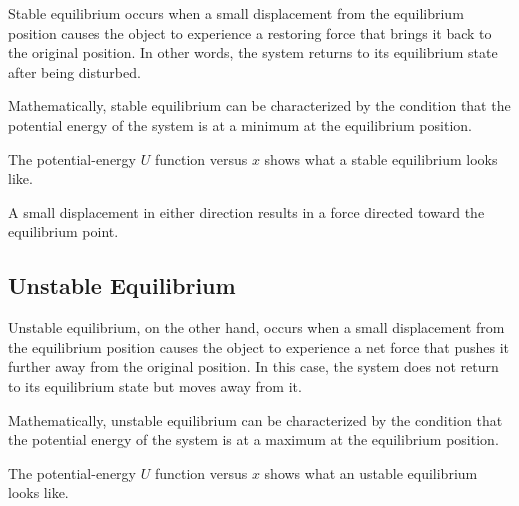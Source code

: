 \documentclass[11pt]{article}
\begin{document}
Stable equilibrium occurs when a small displacement from the equilibrium position causes the object to experience a restoring force that brings it back to the original position. In other words, the system returns to its equilibrium state after being disturbed. 

Mathematically, stable equilibrium can be characterized by the condition that the potential energy of the system is at a minimum at the equilibrium position. 

The potential-energy $U$ function versus $x$ shows what a stable equilibrium looks like.

\begin{center}
\end{center}

A small displacement in either direction results in a force directed toward the equilibrium point.

\subsection{Unstable Equilibrium}

Unstable equilibrium, on the other hand, occurs when a small displacement from the equilibrium position causes the object to experience a net force that pushes it further away from the original position. In this case, the system does not return to its equilibrium state but moves away from it.

Mathematically, unstable equilibrium can be characterized by the condition that the potential energy of the system is at a maximum at the equilibrium position. 


The potential-energy $U$ function versus $x$ shows what an ustable equilibrium looks like.

\begin{center}
\end{center}
\end{document}
